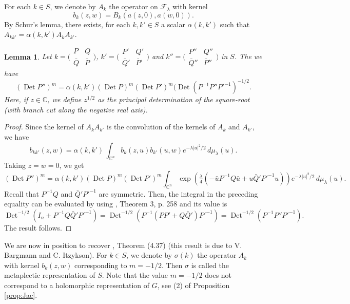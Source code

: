 \documentclass[12pt]{amsart}
\numberwithin{equation}{section}
\newtheorem{lemma}[theorem]{Lemma}
\DeclareMathOperator{\Det}{Det} \DeclareMathOperator{\Tr}{Tr}
\begin{document}
For each $k\in S$, we denote by $A_k$ the operator on ${\mathcal F}_{\lambda}$ with kernel
$$b_k(z,w)=B_k(a(z,0),a(w,0)).$$ By Schur's lemma, there exists, for each $k,k'\in S$ a scalar
$\alpha (k,k')$ such that $A_{kk'}=\alpha (k,k')A_kA_{k'}$.

\begin{lemma}\label{lem:alpha} Let $k=\bigl(\begin{smallmatrix} P&Q\\
{\bar Q}&{\bar P} \end{smallmatrix}\bigr)$, $k'=\bigl(\begin{smallmatrix} P'&Q'\\
{\bar Q'}&{\bar P'} \end{smallmatrix}\bigr)$ and $k''=\bigl(\begin{smallmatrix} P''&Q''\\
{\bar Q''}&{\bar P''} \end{smallmatrix}\bigr)$ in $S$. The we have
\begin{equation*}(\Det P'')^m=\alpha (k,k')(\Det P)^m(\Det P')^m(\Det (P^{-1}P''P'^{-1})^{-1/2}.\end{equation*}
Here, if $z\in {\mathbb C}$, we define $z^{1/2}$ as the principal determination of the square-root (with branch cut along the negative real axis).
\end{lemma}
\begin{proof} Since the kernel of $A_kA_{k'}$ is the convolution of the kernels of $A_k$
and $A_{k'}$, we have
\begin{equation*}b_{kk'}(z,w)=\alpha (k,k')\,\int_{{\mathbb C}^n}b_k(z,u)b_{k'}(u,w)
e^{-\lambda \vert
u\vert^2/2}\,d\mu_{\lambda} (u).
\end{equation*} Taking $z=w=0$, we get
\begin{equation*}(\Det P'')^m=\alpha (k,k')(\Det P)^m(\Det P')^m
\int_{{\mathbb C}^n}\exp \left( \tfrac{\lambda}{4}\left(-{\bar u}P^{-1}Q{\bar u}+u {\bar Q'}
P'^{-1}u\right)\right)e^{-\lambda \vert
u\vert^2/2}\,d\mu_{\lambda} (u).
\end{equation*}
Recall that $P^{-1}Q$ and ${\bar Q'}
P'^{-1}$ are symmetric. Then, the integral in the preceding equality can be evaluated by using
\cite{Fo}, Theorem 3, p. 258 and its value is
\begin{equation*}\Det ^{-1/2}(I_n+P^{-1}Q{\bar Q'}
P'^{-1})=\Det ^{-1/2}(P^{-1}(PP'+Q{\bar Q'})P'^{-1})=
\Det ^{-1/2}(P^{-1}P''P'^{-1}).\end{equation*}
The result follows.
\end{proof}
We are now in position to recover \cite{Fo}, Theorem (4.37) (this result is due to V. Bargmann and C. Itzykson). For $k\in S$, we denote by $\sigma(k)$ the operator $A_k$ with kernel
$b_k(z,w)$ corresponding to $m=-1/2$. Then $\sigma$ is called the metaplectic representation of $S$. Note that the value $m=-1/2$ does not correspond to a holomorphic representation of 
$G$, see (2) of Proposition \ref{prop:Jac}.
\end{document}
